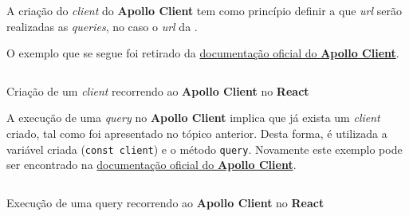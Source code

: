 
A criação do \textit{client} do \textbf{Apollo Client} tem como princípio definir a que \textit{url} serão realizadas as \textit{queries}, no caso o \textit{url} da .

O exemplo que se segue foi retirado da \href{https://www.apollographql.com/docs/react/get-started/}{documentação oficial do \textbf{Apollo Client}}.

\begin{longlisting}
	\inputminted[highlightlines={3-6},highlightcolor=yellow!25]{js}{code/graphql/create-apollo-client.ts}
	\caption{Criação de um \textit{client} recorrendo ao \textbf{Apollo Client} no \textbf{React}}
\end{longlisting}


A execução de uma \textit{query} no \textbf{Apollo Client} implica que já exista um \textit{client} criado, tal como foi apresentado no tópico anterior. Desta forma, é utilizada a variável criada (\texttt{const client}) e o método \texttt{query}. Novamente este exemplo pode ser encontrado na \href{https://www.apollographql.com/docs/react/get-started/}{documentação oficial do \textbf{Apollo Client}}.

\begin{longlisting}
	\inputminted[highlightlines={7-13},highlightcolor=yellow!25]{js}{code/graphql/use-apollo-client.ts}
	\caption{Execução de uma query recorrendo ao \textbf{Apollo Client} no \textbf{React}}
\end{longlisting}


